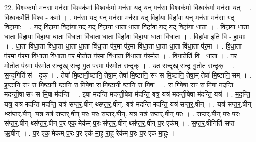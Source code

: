 \documentclass[17pt]{extarticle}
\begin{document}
22. वि॒श्वक॑र्मा॒ मन॑सा॒ मन॑सा वि॒श्वक॑र्मा वि॒श्वक॑र्मा॒ मन॑सा॒ यद् यन् मन॑सा वि॒श्वक॑र्मा वि॒श्वक॑र्मा॒ मन॑सा॒ यत् । . वि॒श्वक॒र्मेति॑ वि॒श्व - क॒र्मा॒ । . मन॑सा॒ यद् यन् मन॑सा॒ मन॑सा॒ यद् विहा॑या॒ विहा॑या॒ यन् मन॑सा॒ मन॑सा॒ यद् विहा॑याः । . यद् विहा॑या॒ विहा॑या॒ यद् यद् विहा॑या धा॒ता धा॒ता विहा॑या॒ यद् यद् विहा॑या धा॒ता । . विहा॑या धा॒ता धा॒ता विहा॑या॒ विहा॑या धा॒ता वि॑धा॒ता वि॑धा॒ता धा॒ता विहा॑या॒ विहा॑या धा॒ता वि॑धा॒ता । . विहा॑या॒ इति॒ वि - हा॒याः॒ । . धा॒ता वि॑धा॒ता वि॑धा॒ता धा॒ता धा॒ता वि॑धा॒ता प॑र॒मा प॑र॒मा वि॑धा॒ता धा॒ता धा॒ता वि॑धा॒ता प॑र॒मा । . वि॒धा॒ता प॑र॒मा प॑र॒मा वि॑धा॒ता वि॑धा॒ता प॑र॒ मोतोत प॑र॒मा वि॑धा॒ता वि॑धा॒ता प॑र॒मोत । . वि॒धा॒तेति॑ वि - धा॒ता । . प॒र॒ मोतोत प॑र॒मा प॑र॒मोत स॒न्दृख् स॒न्दृ गु॒त प॑र॒मा प॑र॒मोत स॒न्दृक् । . उ॒त स॒न्दृख् स॒न्दृ गु॒तोत स॒न्दृक् । . स॒न्दृगिति॑ सं - दृक् । . तेषा॑ मि॒ष्टानी॒ष्टानि॒ तेषा॒म् तेषा॑ मि॒ष्टानि॒ सꣳ स मि॒ष्टानि॒ तेषा॒म् तेषा॑ मि॒ष्टानि॒ सम् । . इ॒ष्टानि॒ सꣳ स मि॒ष्टानी॒ ष्टानि॒ स मि॒षेषा स मि॒ष्टानी॒ ष्टानि॒ स मि॒षा । . स मि॒षेषा सꣳ स मि॒षा म॑दन्ति मदन्ती॒षा सꣳ स मि॒षा म॑दन्ति । . इ॒षा म॑दन्ति मदन्ती॒षेषा म॑दन्ति॒ यत्र॒ यत्र॑ मदन्ती॒षेषा म॑दन्ति॒ यत्र॑ । . म॒द॒न्ति॒ यत्र॒ यत्र॑ मदन्ति मदन्ति॒ यत्र॑ सप्त॒र्॒.षीन् थ्स॑प्त॒र्॒.षीन्. यत्र॑ मदन्ति मदन्ति॒ यत्र॑ सप्त॒र्॒.षीन् । . यत्र॑ सप्त॒र्॒.षीन् थ्स॑प्त॒र्॒.षीन्. यत्र॒ यत्र॑ सप्त॒र्॒.षीन् प॒रः प॒रः स॑प्त॒र्॒.षीन्. यत्र॒ यत्र॑ सप्त॒र्॒.षीन् प॒रः । . स॒प्त॒र्॒.षीन् प॒रः प॒रः स॑प्त॒र्॒.षीन् थ्स॑प्त॒र्॒.षीन् प॒र एक॒ मेक॑म् प॒रः स॑प्त॒र्॒.षीन् थ्स॑प्त॒र्॒.षीन् प॒र एक᳚म् । . स॒प्त॒र्॒.षीनिति॑ सप्त - ऋ॒षीन् । . प॒र एक॒ मेक॑म् प॒रः प॒र एक॑ मा॒हु रा॒हु रेक॑म् प॒रः प॒र एक॑ मा॒हुः । \newline
\end{document}
